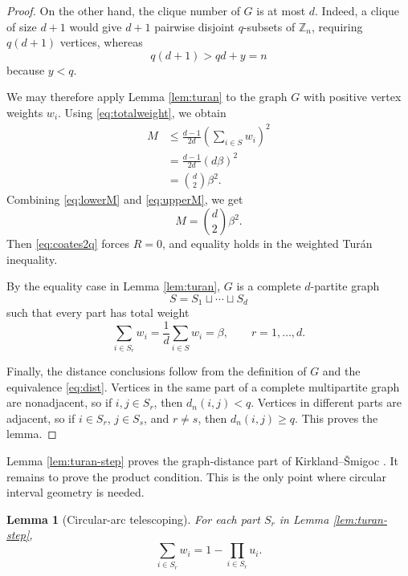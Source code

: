 \documentclass[11pt]{article}
\numberwithin{equation}{section}
\newtheorem{lemma}[theorem]{Lemma}
\newcommand{\Zn}{\mathbb Z_n}
\begin{document}
\begin{proof}
On the other hand, the clique number of $G$ is at most $d$. Indeed, a clique
of size $d+1$ would give $d+1$ pairwise disjoint $q$-subsets of $\Zn$,
requiring $q(d+1)$ vertices, whereas
\[
        q(d+1)>qd+y=n
\]
because $y<q$.

We may therefore apply Lemma \ref{lem:turan} to the graph $G$ with positive
vertex weights $w_i$. Using \eqref{eq:totalweight}, we obtain
\begin{equation}
        \begin{aligned}
        M
        &\le
        \frac{d-1}{2d}\left(\sum_{i\in S}w_i\right)^2\\
        &=\frac{d-1}{2d}(d\beta)^2\\
        &=\binom d2\beta^2.
        \end{aligned}
        \label{eq:upperM}
\end{equation}
Combining \eqref{eq:lowerM} and \eqref{eq:upperM}, we get
\[
        M=\binom d2\beta^2.
\]
Then \eqref{eq:coates2q} forces $R=0$, and equality holds in the weighted
Tur\'an inequality.

By the equality case in Lemma \ref{lem:turan}, $G$ is a complete
$d$-partite graph
\[
        S=S_1\sqcup\cdots\sqcup S_d
\]
such that every part has total weight
\[
        \sum_{i\in S_r}w_i=\frac1d\sum_{i\in S}w_i=\beta,
        \qquad r=1,\ldots,d.
\]

Finally, the distance conclusions follow from the definition of $G$ and the
equivalence \eqref{eq:dist}. Vertices in the same part of a complete
multipartite graph are nonadjacent, so if $i,j\in S_r$, then
$d_n(i,j)<q$. Vertices in different parts are adjacent, so if $i\in S_r$,
$j\in S_s$, and $r\ne s$, then $d_n(i,j)\ge q$. This proves the lemma.
\end{proof}

Lemma \ref{lem:turan-step} proves the graph-distance part of Kirkland--\v{S}migoc
\cite[Proposition 7.1]{KirklandSmigoc}. It remains to prove the product
condition. This is the only point where circular interval geometry is needed.

\begin{lemma}[Circular-arc telescoping]\label{lem:telescoping}
For each part $S_r$ in Lemma \ref{lem:turan-step},
\[
        \sum_{i\in S_r}w_i=1-\prod_{i\in S_r}u_i.
\]
\end{lemma}
\end{document}
